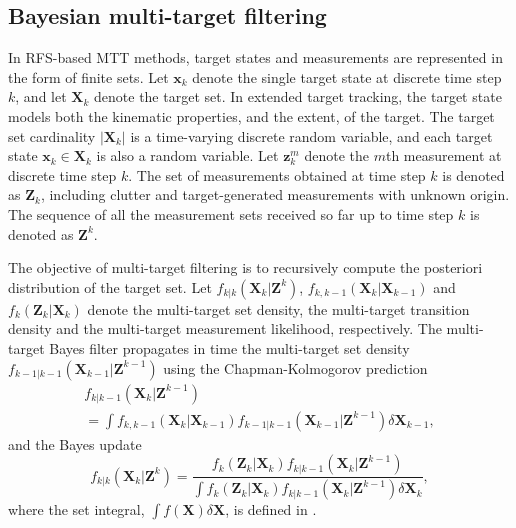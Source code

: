 \documentclass[journal]{IEEEtran}
\begin{document}
\subsection{Bayesian multi-target filtering}

In RFS-based MTT methods, target states and measurements are represented in the form of finite sets. Let $\mathbf{x}_k$ denote the single target state at discrete time step $k$, and let $\mathbf{X}_k$ denote the target set. In extended target tracking, the target state models both the kinematic properties, and the extent, of the target. The target set cardinality $|\mathbf{X}_k|$ is a time-varying discrete random variable, and each target state $\mathbf{x}_k\in\mathbf{X}_k$ is also a random variable. Let $\mathbf{z}^m_k$ denote the $m$th measurement at discrete time step $k$. The set of measurements obtained at time step $k$ is denoted as $\mathbf{Z}_k$, including clutter and target-generated measurements with unknown origin. The sequence of all the measurement sets received so far up to time step $k$ is denoted as $\mathbf{Z}^k$.


The objective of multi-target filtering is to recursively compute the posteriori distribution of the target set. Let $f_{k|k}(\mathbf{X}_k|\mathbf{Z}^k)$, $f_{k,k-1}(\mathbf{X}_k|\mathbf{X}_{k-1})$ and $f_k(\mathbf{Z}_k|\mathbf{X}_k)$ denote the multi-target set density, the multi-target transition density and the multi-target measurement likelihood, respectively. The multi-target Bayes filter propagates in time the multi-target set density $f_{k-1|k-1}(\mathbf{X}_{k-1}|\mathbf{Z}^{k-1})$ using the Chapman-Kolmogorov prediction
\begin{multline}
f_{k|k-1}(\mathbf{X}_k|\mathbf{Z}^{k-1}) \\= \int f_{k,k-1}(\mathbf{X}_k|\mathbf{X}_{k-1})f_{k-1|k-1}(\mathbf{X}_{k-1}|\mathbf{Z}^{k-1})\delta \mathbf{X}_{k-1},
\label{eq:bayespredict}
\end{multline}
and the Bayes update
\begin{equation}
f_{k|k}(\mathbf{X}_k|\mathbf{Z}^k) = \frac{f_{k}(\mathbf{Z}_k|\mathbf{X}_k)f_{k|k-1}(\mathbf{X}_k|\mathbf{Z}^{k-1})}{\int f_{k}(\mathbf{Z}_k|\mathbf{X}_k)f_{k|k-1}(\mathbf{X}_k|\mathbf{Z}^{k-1})\delta \mathbf{X}_k},
\label{eq:bayesupdate}
\end{equation}
where the set integral, $\int f(\mathbf{X}) \delta \mathbf{X}$, is defined in \cite[Sec 11.3.3]{rfs}.
\end{document}
